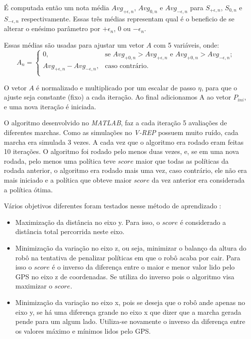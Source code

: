 \documentclass[12pt]{report}
\begin{document}
É computada então um nota média $Avg_{+\epsilon,n}$, $Avg_{0,n}$ e $Avg_{-\epsilon,n}$ para $S_{+\epsilon,n}$, $S_{0,n}$ e $S_{-\epsilon,n}$ respectivamente. Essas três médias representam qual é o beneficio de se alterar o enésimo parâmetro por $+\epsilon_n$, $0$ ou $-\epsilon_n$.

Essas médias são usadas para ajustar um vetor $A$ com 5 variáveis, onde:
$$A_n = \left \{
\begin{array}{cl}
0, & \text{se } Avg_{+0,n} >  Avg_{+\epsilon,n} \text{ e }  Avg_{+0,n} >  Avg_{-\epsilon,n};\\
Avg_{+\epsilon,n} - Avg_{-\epsilon,n}, & \text{caso contrário.}\\
\end{array}
\right.$$

O vetor $A$ é normalizado e multiplicado por um escalar de passo $\eta$, para que o ajuste seja constante (fixo) a cada iteração. Ao final adicionamos A ao vetor $P_{ini}$, e uma nova iteração é iniciada.

O algoritmo desenvolvido no \emph{MATLAB}, faz a cada iteração 5 avaliações de diferentes marchas. Como as simulações no \textit{V-REP} possuem muito ruído, cada marcha era simulada 3 vezes. A cada vez que o algoritmo era rodado eram feitas 10 iterações. O algoritmo foi rodado pelo menos duas vezes, e, se em uma nova rodada, pelo menos uma política teve $score$ maior que todas as políticas da rodada anterior, o algoritmo era rodado mais uma vez, caso contrário, ele não era mais iniciado e a política que obteve maior $score$ da vez anterior era considerada a política ótima. 

Vários objetivos diferentes foram testados nesse método de aprendizado \cite{7}:

\begin{itemize}
    \item Maximização da distância no eixo y. Para isso, o $score$ é considerado a distância total percorrida neste eixo.
    
    \item Minimização da variação no eixo z, ou seja, minimizar o balanço da altura do robô na tentativa de penalizar políticas em que o robô acaba por cair. Para isso o $score$ é o inverso da diferença entre o maior e menor valor lido pelo GPS no  eixo z de coordenadas. Se utiliza do inverso pois o algoritmo visa maximizar o $score$.
    
    \item Minimização da variação no eixo x, pois se deseja que o robô ande apenas no eixo y, se há uma diferença grande no eixo x que dizer que a marcha gerada pende para um algum lado. Utiliza-se novamente o inverso da diferença entre os valores máximo e mínimos lidos pelo GPS.
    
\end{itemize}
\end{document}
